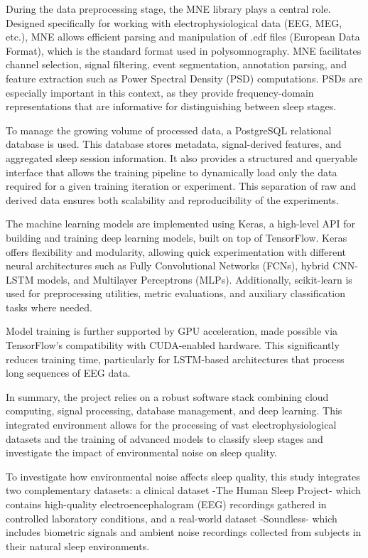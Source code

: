 During the data preprocessing stage, the MNE library plays a central role. Designed specifically for working with electrophysiological data (EEG, MEG, etc.), MNE allows efficient parsing and manipulation of .edf files (European Data Format), which is the standard format used in polysomnography. MNE facilitates channel selection, signal filtering, event segmentation, annotation parsing, and feature extraction such as Power Spectral Density (PSD) computations. PSDs are especially important in this context, as they provide frequency-domain representations that are informative for distinguishing between sleep stages.

To manage the growing volume of processed data, a PostgreSQL relational database is used. This database stores metadata, signal-derived features, and aggregated sleep session information. It also provides a structured and queryable interface that allows the training pipeline to dynamically load only the data required for a given training iteration or experiment. This separation of raw and derived data ensures both scalability and reproducibility of the experiments.

The machine learning models are implemented using Keras, a high-level API for building and training deep learning models, built on top of TensorFlow. Keras offers flexibility and modularity, allowing quick experimentation with different neural architectures such as Fully Convolutional Networks (FCNs), hybrid CNN-LSTM models, and Multilayer Perceptrons (MLPs). Additionally, scikit-learn is used for preprocessing utilities, metric evaluations, and auxiliary classification tasks where needed.

Model training is further supported by GPU acceleration, made possible via TensorFlow’s compatibility with CUDA-enabled hardware. This significantly reduces training time, particularly for LSTM-based architectures that process long sequences of EEG data.

In summary, the project relies on a robust software stack combining cloud computing, signal processing, database management, and deep learning. This integrated environment allows for the processing of vast electrophysiological datasets and the training of advanced models to classify sleep stages and investigate the impact of environmental noise on sleep quality.

To investigate how environmental noise affects sleep quality, this study integrates two complementary datasets: a clinical dataset -The Human Sleep Project- which contains high-quality electroencephalogram (EEG) recordings gathered in controlled laboratory conditions, and a real-world dataset -Soundless- which includes biometric signals and ambient noise recordings collected from subjects in their natural sleep environments.

